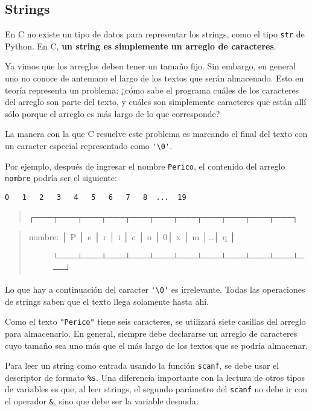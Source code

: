 \subsection{Strings}

En C no existe un tipo de datos para representar los strings, como el
tipo \lstinline!str! de Python. En C, \textbf{un string es simplemente
un arreglo de caracteres}.

Ya vimos que los arreglos deben tener un tamaño fijo. Sin embargo, en
general uno no conoce de antemano el largo de los textos que serán
almacenado. Esto en teoría representa un problema: ¿cómo sabe el
programa cuáles de los caracteres del arreglo son parte del texto, y
cuáles son simplemente caracteres que están allí sólo porque el arreglo
es más largo de lo que corresponde?

La manera con la que C resuelve este problema es marcando el final del
texto con un caracter especial representado como \lstinline!'\0'!.

Por ejemplo, después de ingresar el nombre \lstinline!Perico!, el
contenido del arreglo \lstinline!nombre! podría ser el siguiente:

\begin{lstlisting}
0   1   2   3   4   5   6   7   8  ...  19
\end{lstlisting}

\begin{quote}
┌───┬───┬───┬───┬───┬───┬───┬───┬───┬───┬───┐
\end{quote}

\begin{quote}
\begin{description}
\item[nombre: │ P │ e │ r │ i │ c │ o │ 0│ x │ m │\ldots{}│ q │]
└───┴───┴───┴───┴───┴───┴───┴───┴───┴───┴───┘
\end{description}
\end{quote}

Lo que hay a continuación del caracter \lstinline!'\0'! es irrelevante.
Todas las operaciones de strings saben que el texto llega solamente
hasta ahí.

Como el texto \lstinline!"Perico"! tiene seis caracteres, se utilizará
siete casillas del arreglo para almacenarlo. En general, siempre debe
declararse un arreglo de caracteres cuyo tamaño sea uno más que el más
largo de los textos que se podría almacenar.

Para leer un string como entrada usando la función \lstinline!scanf!, se
debe usar el descriptor de formato \lstinline!%s!. Una diferencia
importante con la lectura de otros tipos de variables es que, al leer
strings, el segundo parámetro del \lstinline!scanf! no debe ir con el
operador \lstinline!&!, sino que debe ser la variable desnuda:

